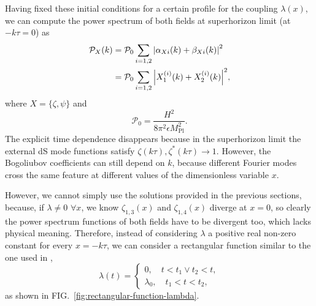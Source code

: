 \documentclass[
 aip,
 jmp,
 amsmath,amssymb,
 reprint,
 nofootinbib,
]{revtex4-2}
\begin{document}
Having fixed these initial conditions for a certain profile for the coupling $\lambda(x)$, we can compute the power spectrum of both fields at superhorizon limit (at $- k \tau = 0$) as
\begin{align}
    \mathcal{P}_{X}(k) & = \mathcal{P}_0 \sum_{i = 1,2} \abs{\alpha_{X i}(k) + \beta_{X i}(k)}^2 \notag \\
    & = \mathcal{P}_0 \sum_{i = 1,2} \abs{X_1^{(i)}(k) + X_2^{(i)}(k)}^2,
\end{align}
where $X = \{\zeta,\psi\}$ and
\begin{equation}
    \mathcal{P}_0 = \frac{H^2}{8 \pi^2 \epsilon M_{\text{Pl}}^2}.
\end{equation}
The explicit time dependence disappears because in the superhorizon limit the external dS mode functions satisfy $\zeta(k\tau),\zeta^*(k\tau)\to1$. However, the Bogoliubov coefficients can still depend on $k$, because different Fourier modes cross the same feature at different values of the dimensionless variable $x$.

However, we cannot simply use the solutions provided in the previous sections, because, if $\lambda \neq 0$ $\forall x$, we know $\zeta_{1,3}(x)$ and $\zeta_{1,4}(x)$ diverge at $x = 0$, so clearly the power spectrum functions of both fields have to be divergent too, which lacks physical meaning. Therefore, instead of considering $\lambda$ a positive real non-zero constant for every $x = - k \tau$, we can consider a rectangular function similar to the one used in \cite{Palma_2020},
\begin{equation}
\lambda(t) = \begin{cases}
  0, \quad t < t_1 \vee t_2 < t,\\
  \lambda_0, \quad t_1 < t < t_2,
\end{cases}%
\label{eq:lambda(t)-cases}
\end{equation}
as shown in FIG.~\ref{fig:rectangular-function-lambda}.
\end{document}
